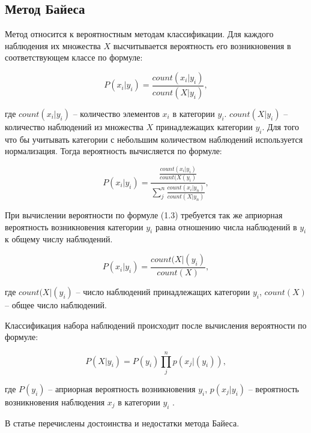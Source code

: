 \subsection{Метод Байеса}

Метод относится к
вероятностным методам классификации. Для каждого наблюдения их множества $X$
высчитывается вероятность его возникновения
в соответствующем классе по формуле:


\begin{equation}
	P(x_{i}|y_{i}) = \frac{count(x_{i}|y_{i})}{count(X|y_{i})},
\end{equation}

где $count(x_{i}|y_{i})$ -- количество элементов $x_{i}$ в
категории $y_{i}$. $count(X|y_{i})$ -- количество наблюдений из множества $X$ принадлежащих категории $y_{i}$.
Для того что бы учитывать категории с небольшим количеством наблюдений используется нормализация. Тогда вероятность вычисляется по формуле:

\begin{equation}
	P(x_{i}|y_{i}) = \frac{\frac{count(x_{i}|y_{i})}{count(X(y_{i})}}{\sum\limits_{j}^{n}\frac{count(x_{i}|y_{n})}{count(X|y_{n})} },
\end{equation}

При вычислении вероятности по формуле (1.3) требуется так
же априорная вероятность возникновения категории $y_{i}$ равна отношению числа наблюдений
в  $y_{i}$ к общему числу наблюдений.

\begin{equation}
	P(x_{i}|y_{i}) = \frac{count(X|(y_{i})}{count(X)},
\end{equation}

где $count(X|(y_{i})$ -- число наблюдений принадлежащих категории $y_{i}$, $count(X)$ -- общее
число наблюдений.

Классификация набора наблюдений
происходит после вычисления вероятности по
формуле:

\begin{equation}
	P(X|y_{i}) = P(y_{i})\prod\limits_{j}^{n}p(x_{j}|(y_{i})),
\end{equation}

где $P(y_{i})$ -- априорная вероятность возникновения $y_{i}$, $p(x_{j}|y_{i})$ -- вероятность возникновения наблюдения $x_{j}$ в категории $y_{i}$ \cite{baes1}.


В статье \cite{baes2} перечислены достоинства и недостатки метода Байеса.


